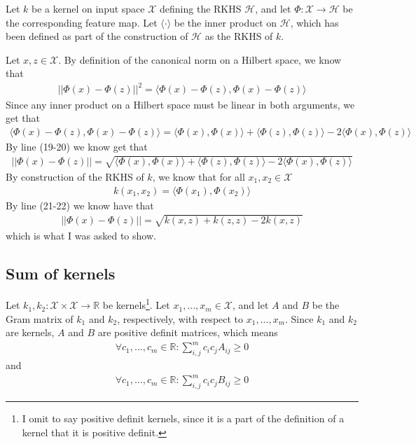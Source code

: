 Let $k$ be a kernel on input space $\mathcal{X}$ defining the RKHS $\mathcal{H}$, and let $\Phi: \mathcal{X} \to \mathcal{H}$ be the corresponding feature map. Let $\langle \cdot \rangle$ be the inner product on $\mathcal{H}$, which has been defined as part of the construction of $\mathcal{H}$ as the RKHS of $k$. 

Let $x,z\in \mathcal{X}$. By definition of the canonical norm on a Hilbert space, we know that
\begin{align}
||\Phi(x) - \Phi(z) ||^2 = \langle \Phi(x) - \Phi(z),\Phi(x) - \Phi(z) \rangle
\end{align}
Since any inner product on a Hilbert space must be linear in both arguments, we get that
\begin{align}
\langle \Phi(x) - \Phi(z),\Phi(x) - \Phi(z) \rangle = 
\langle \Phi(x),\Phi(x) \rangle + \langle \Phi(z),\Phi(z) \rangle - 2\langle \Phi(x) , \Phi(z) \rangle
\end{align}
By line (19-20) we know get that
\begin{align}
||\Phi(x) - \Phi(z) || = \sqrt{\langle \Phi(x),\Phi(x) \rangle + \langle \Phi(z),\Phi(z) \rangle - 2\langle \Phi(x) , \Phi(z) \rangle}
\end{align}
By construction of the RKHS of $k$, we know that for all $x_1, x_2 \in \mathcal{X}$
\begin{align}
k(x_1,x_2)=\langle \Phi(x_1), \Phi(x_2) \rangle
\end{align}
By line (21-22) we know have that
\begin{align}
||\Phi(x) - \Phi(z) || = \sqrt{k(x,z) + k(z,z) - 2k(x,z)}
\end{align}
which is what I was asked to show.

\subsection{Sum of kernels}

Let $k_1, k_2: \mathcal{X}\times \mathcal{X} \to \mathbb{R}$ be kernels\footnote{I omit to say positive definit kernels, since it is a part of the definition of a kernel that it is positive definit.}. Let $x_1,...,x_m \in \mathcal{X}$, and let $A$ and $B$ be the Gram matrix of $k_1$ and $k_2$, respectively, with respect to $x_1,...,x_m$. Since $k_1$ and $k_2$ are kernels, $A$ and $B$ are positive definit matrices, which means
\begin{align}
\forall c_1,...,c_m \in \mathbb{R}: \sum_{i,j}^m c_i c_j A_{ij} \geq 0
\end{align}
and 
\begin{align}
\forall c_1,...,c_m \in \mathbb{R}: \sum_{i,j}^m c_i c_j B_{ij} \geq 0
\end{align}

